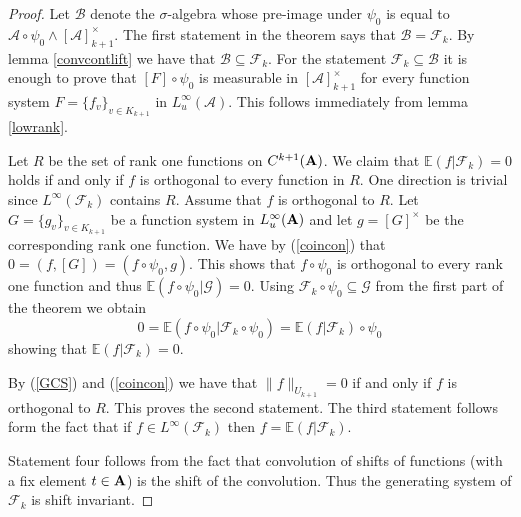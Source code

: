 \documentclass [11pt] {article}
\def\bA{{\bf A}}
\begin{document}
\begin{proof} 

Let $\mathcal{B}$ denote the $\sigma$-algebra whose pre-image under $\psi_0$ is equal to $\mathcal{A}\circ\psi_0\wedge[\mathcal{A}]_{k+1}^\times$. The first statement in the theorem says that $\mathcal{B}=\mathcal{F}_k$. By lemma \ref{convcontlift} we have that $\mathcal{B}\subseteq\mathcal{F}_k$.
For the statement $\mathcal{F}_k\subseteq\mathcal{B}$ it is enough to prove that $[F]\circ\psi_0$ is measurable in $[\mathcal{A}]_{k+1}^\times$ for every function system $F=\{f_v\}_{v\in K_{k+1}}$ in $L^\infty_u(\mathcal{A})$. This follows immediately from lemma \ref{lowrank}.

Let $R$ be the set of rank one functions on $C^{k+1}(\bA)$. We claim that $\mathbb{E}(f|\mathcal{F}_k)=0$ holds if and only if $f$ is orthogonal to every function in $R$. 
One direction is trivial since $L^\infty(\mathcal{F}_k)$ contains $R$. Assume that $f$ is orthogonal to $R$. Let $G=\{g_v\}_{v\in K_{k+1}}$ be a function system in $L^\infty_u(\bA)$ and let $g=[G]^\times$ be the corresponding rank one function. We have by (\ref{coincon}) that $0=(f,[G])=(f\circ \psi_0,g)$. This shows that $f\circ\psi_0$ is orthogonal to every rank one function and thus $\mathbb{E}(f\circ\psi_0|\mathcal{G})=0$. Using $\mathcal{F}_k\circ\psi_0\subseteq\mathcal{G}$ from the first part of the theorem we obtain $$0=\mathbb{E}(f\circ\psi_0|\mathcal{F}_k\circ\psi_0)=\mathbb{E}(f|\mathcal{F}_k)\circ\psi_0$$ showing that $\mathbb{E}(f|\mathcal{F}_k)=0$.

By (\ref{GCS}) and (\ref{coincon}) we have that $\|f\|_{U_{k+1}}=0$ if and only if $f$ is orthogonal to $R$. This proves the second statement. The third statement follows form the fact that if $f\in L^\infty(\mathcal{F}_k)$ then $f=\mathbb{E}(f|\mathcal{F}_k)$.

Statement four follows from the fact that convolution of shifts of functions (with a fix element $t\in\bA$) is the shift of the convolution. Thus the generating system of $\mathcal{F}_k$ is shift invariant.
 

\end{proof}
\end{document}

